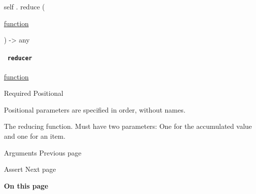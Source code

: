 self { . } { reduce } (

{ \href{/docs/reference/foundations/function/}{function} }

) -\textgreater{} { any }

\paragraph{\texorpdfstring{\texttt{\ reducer\ }}{ reducer }}\label{definitions-reduce-reducer}

\href{/docs/reference/foundations/function/}{function}

{Required} {{ Positional }}

\label{definitions-reduce-reducer-positional-tooltip}
Positional parameters are specified in order, without names.

The reducing function. Must have two parameters: One for the accumulated
value and one for an item.

\href{/docs/reference/foundations/arguments/}{\pandocbounded{}}

{ Arguments } { Previous page }

\href{/docs/reference/foundations/assert/}{\pandocbounded{}}

{ Assert } { Next page }

\textbf{On this page}

